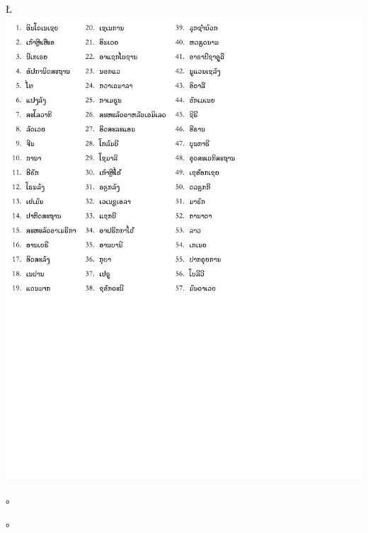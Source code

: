 \L{\includegraphics[trim = 0 320 320 0]{geo57Lao.pdf}}
%
\begin{assgts}
\item \findland。
\item \guessond。
\end{assgts}
%

\makepart{\respsing {\teamcont}}
\pagestyle{somestyle}

